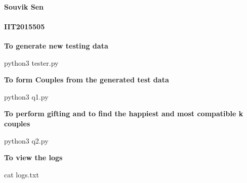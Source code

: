 \paragraph*{Souvik Sen}

\paragraph*{I\+I\+T2015505}

{\bfseries To generate new testing data}


\begin{DoxyCode}
python3 tester.py
\end{DoxyCode}


{\bfseries To form Couples from the generated test data}


\begin{DoxyCode}
python3 q1.py
\end{DoxyCode}


{\bfseries To perform gifting and to find the happiest and most compatible k couples}


\begin{DoxyCode}
python3 q2.py
\end{DoxyCode}


{\bfseries To view the logs}


\begin{DoxyCode}
cat logs.txt
\end{DoxyCode}
 
